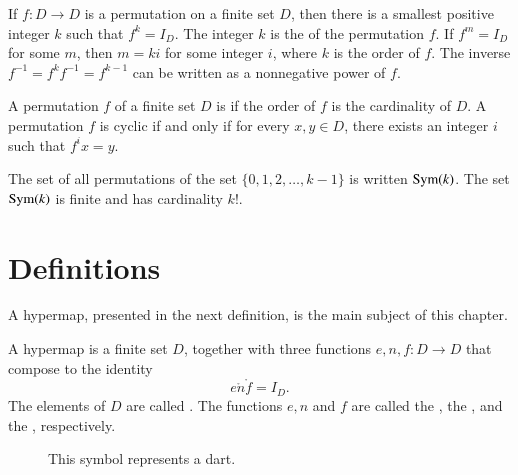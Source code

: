 If $f:D\to D$ is a permutation on a finite set $D$, then there is a
smallest positive integer $k$ such that $f^k=I_D$.  The integer $k$ is
the  of the permutation $f$.  If $f^m=I_D$ for some
$m$, then $m = k i$ for some integer $i$, where $k$ is the order of
$f$. The inverse $f^{-1} = f^k f^{-1} = f^{k-1}$ can be written as a
nonnegative power of $f$.

A permutation $f$ of a finite set $D$ is  if the order
of $f$ is the cardinality of $D$.  A permutation $f$ is cyclic if and
only if for every $x,y\in D$, there exists an integer $i$ such that
$f^i x = y$.

The set of all permutations of the set $\{0,1,2,\ldots,k-1\}$ is written ${\operatorname{Sym}}(k)$.
The set ${\operatorname{Sym}}(k)$ is finite and has cardinality $k!$.



\section{Definitions}

A hypermap, presented in the next definition, is the main subject of this chapter.

\begin{definition}\label{def:hypermap}  
  A hypermap is a finite set $D$, together with three functions
  $e,n,f:D\to D$ that compose to the identity
  \[ 
e\ocirc n\ocirc f = I_D.
\]  The
elements of $D$ are called .  The functions $e,n$ and
$f$ are called the , the , and
the , respectively.  %
%
%
%
%
%
%
%
%
\end{definition}

\begin{figure}[htb]
\centering
{}
\caption{This symbol represents a dart.}
\label{fig:dart}
\end{figure}

